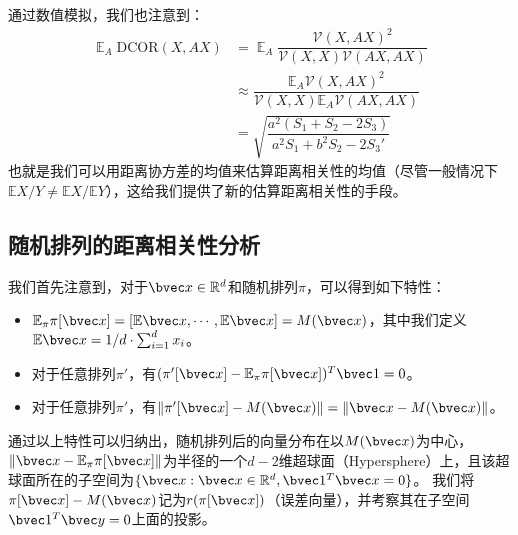 通过数值模拟，我们也注意到：
\begin{equation}
\label{eq:ss-perm:linear-dcor-estimation}
\begin{split}
    \mathop{\mathbb E}_A \text{DCOR}(X, AX) & = \mathop{\mathbb E}_A \dfrac{\mathcal{V}(X, AX)^2}{\mathcal{V}(X, X)\mathcal{V}(AX, AX)}
    \\
    &\approx \dfrac{\mathbb E_A \mathcal{V}(X, AX)^2}{\mathcal{V}(X, X) \mathbb E_A \mathcal{V}(AX, AX)}
    \\
    &= \sqrt{\dfrac{a^2(S_1 + S_2 - 2S_3)}{a^2S_1 + b^2S_2 - 2S_3'}}
\end{split}
\end{equation}
%
也就是我们可以用距离协方差的均值来估算距离相关性的均值（尽管一般情况下$\mathbb E X/Y \ne \mathbb E X/\mathbb E Y$），这给我们提供了新的估算距离相关性的手段。
%


\subsection{随机排列的距离相关性分析}
我们首先注意到，对于$\bvec x \in \mathbb R^d$和随机排列$\pi$，可以得到如下特性：
\begin{itemize}
    \item $\mathbb E_\pi \pi[\bvec x] = [\mathbb E\bvec x, \cdots, \mathbb E\bvec x] = M(\bvec x)$，其中我们定义$\mathbb E\bvec x = 1/d \cdot \sum_{i=1}^d x_i$。
    \item 对于任意排列$\pi'$，有$(\pi'[\bvec x] - \mathbb E_{\pi}\pi[\bvec x])^T \bvec 1 = 0$。
    \item 对于任意排列$\pi'$，有$\Vert \pi'[\bvec x] - M(\bvec x)\Vert = \Vert \bvec x - M(\bvec x)\Vert$。
\end{itemize}
%
通过以上特性可以归纳出，随机排列后的向量分布在以$M(\bvec x)$为中心，$\Vert \bvec x - \mathbb E_\pi \pi[\bvec x]\Vert$为半径的一个$d - 2$维超球面（Hypersphere）上，且该超球面所在的子空间为$\{\bvec x: \bvec x \in \mathbb R^d, \bvec 1^T\bvec x = 0\}$。
%
我们将$\pi[\bvec x] - M(\bvec x)$记为$r(\pi[\bvec x])$（误差向量），并考察其在子空间$\bvec 1^T \bvec y = 0$上面的投影。
%

